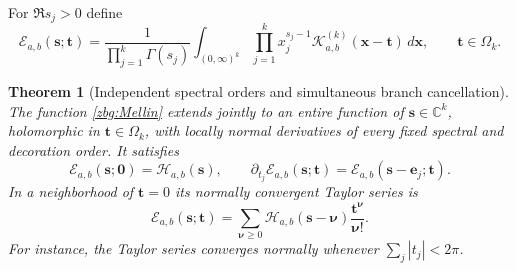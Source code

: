 \documentclass[11pt,letterpaper]{article}
\numberwithin{equation}{section}
\theoremstyle{plain}
\newtheorem{theorem}{Theorem}[section]
\theoremstyle{definition}
\theoremstyle{remark}
\begin{document}
For $\Re s_j>0$ define
\begin{equation}\label{zbg:Mellin}
 \mathscr E_{a,b}(\boldsymbol s;\boldsymbol t)
 =\frac1{\prod_{j=1}^k\Gamma(s_j)}
   \int_{(0,\infty)^k}\prod_{j=1}^k x_j^{s_j-1}
      \mathscr K_{a,b}^{(k)}(\boldsymbol x-\boldsymbol t)
           \,d\boldsymbol x,\qquad\boldsymbol t\in\Omega_k.
\end{equation}

\begin{theorem}[Independent spectral orders and simultaneous branch cancellation]
\label{zbg:entire}
The function \eqref{zbg:Mellin} extends jointly to an entire function
of $\boldsymbol s\in\mathbb C^k$, holomorphic in
$\boldsymbol t\in\Omega_k$, with locally normal derivatives of
every fixed spectral and decoration order.  It satisfies
\begin{equation}\label{zbg:lowering}
 \mathscr E_{a,b}(\boldsymbol s;\boldsymbol0)
       =\mathcal H_{a,b}(\boldsymbol s),\qquad
 \partial_{t_j}\mathscr E_{a,b}(\boldsymbol s;\boldsymbol t)
       =\mathscr E_{a,b}(\boldsymbol s-\boldsymbol e_j;\boldsymbol t).
\end{equation}
In a neighborhood of $\boldsymbol t=0$ its normally convergent Taylor
series is
\begin{equation}\label{zbg:Taylor}
 \mathscr E_{a,b}(\boldsymbol s;\boldsymbol t)
 =\sum_{\boldsymbol\nu\geq0}
     \mathcal H_{a,b}(\boldsymbol s-\boldsymbol\nu)
                          \frac{\boldsymbol t^{\boldsymbol\nu}}{\boldsymbol\nu!}.
\end{equation}
For instance, the Taylor series converges normally whenever
$\sum_j|t_j|<2\pi$.
\end{theorem}
\end{document}

